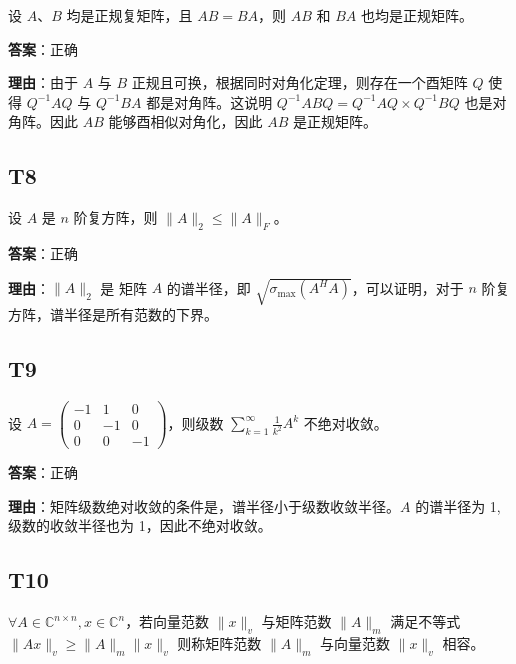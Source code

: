 \documentclass{article}
\begin{document}
\par 设 $A、B$ 均是正规复矩阵，且 $AB=BA$，则 $AB$ 和 $BA$ 也均是正规矩阵。

\par \textbf{答案}：正确

\par \textbf{理由}：由于 $A$ 与 $B$ 正规且可换，根据同时对角化定理，则存在一个酉矩阵 $Q$ 使得 $Q^{-1}AQ$ 与 $Q^{-1}BA$ 都是对角阵。这说明 $Q^{-1}ABQ = Q^{-1}AQ\times Q^{-1}BQ$ 也是对角阵。因此 $AB$ 能够酉相似对角化，因此 $AB$ 是正规矩阵。

\subsection{T8}

\par 设 $A$ 是 $n$ 阶复方阵，则 $\|A\|_2\leq \|A\|_F$。

\par \textbf{答案}：正确

\par \textbf{理由}：$\|A\|_2$ 是 矩阵 $A$ 的谱半径，即 $\sqrt{\sigma_{\text{max}}(A^HA)}$，可以证明，对于 $n$ 阶复方阵，谱半径是所有范数的下界。

\subsection{T9}

\par 设 $A=\begin{pmatrix}-1 & 1 & 0\\0 & -1 & 0\\0 & 0 &-1\end{pmatrix}$，则级数 $\sum_{k=1}^{\infty}\frac{1}{k^2}A^k$ 不绝对收敛。

\par \textbf{答案}：正确

\par \textbf{理由}：矩阵级数绝对收敛的条件是，谱半径小于级数收敛半径。$A$ 的谱半径为 1,级数的收敛半径也为 1，因此不绝对收敛。

\subsection{T10}

\par $\forall A\in \mathbb C^{n\times n}, x\in \mathbb C^n$，若向量范数 $\|x\|_v$ 与矩阵范数 $\|A\|_m$ 满足不等式 $\|Ax\|_v\geq \|A\|_m \|x\|_v$ 则称矩阵范数 $\|A\|_m$ 与向量范数 $\|x\|_v$ 相容。
\end{document}
